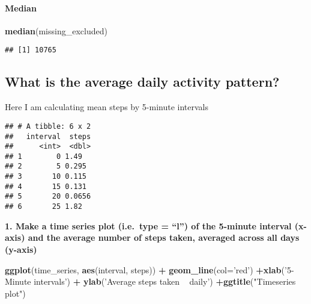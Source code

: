 \documentclass[]{article}
\newenvironment{Shaded}{\begin{snugshade}}{\end{snugshade}}
\newcommand{\CommentTok}[1]{\textcolor[rgb]{0.56,0.35,0.01}{\textit{#1}}}
\newcommand{\DataTypeTok}[1]{\textcolor[rgb]{0.13,0.29,0.53}{#1}}
\newcommand{\DecValTok}[1]{\textcolor[rgb]{0.00,0.00,0.81}{#1}}
\newcommand{\KeywordTok}[1]{\textcolor[rgb]{0.13,0.29,0.53}{\textbf{#1}}}
\newcommand{\NormalTok}[1]{#1}
\newcommand{\OperatorTok}[1]{\textcolor[rgb]{0.81,0.36,0.00}{\textbf{#1}}}
\newcommand{\StringTok}[1]{\textcolor[rgb]{0.31,0.60,0.02}{#1}}
\let\oldparagraph\paragraph
\renewcommand{\paragraph}[1]{\oldparagraph{#1}\mbox{}}
\begin{document}
\hypertarget{median}{%
\paragraph{Median}\label{median}}

\begin{Shaded}
\begin{Highlighting}[]
\KeywordTok{median}\NormalTok{(missing_excluded)}
\end{Highlighting}
\end{Shaded}

\begin{verbatim}
## [1] 10765
\end{verbatim}

\hypertarget{what-is-the-average-daily-activity-pattern}{%
\subsection{What is the average daily activity
pattern?}\label{what-is-the-average-daily-activity-pattern}}

Here I am calculating mean steps by 5-minute intervals

\begin{Shaded}
\end{Shaded}

\begin{verbatim}
## # A tibble: 6 x 2
##   interval  steps
##      <int>  <dbl>
## 1        0 1.49  
## 2        5 0.295 
## 3       10 0.115 
## 4       15 0.131 
## 5       20 0.0656
## 6       25 1.82
\end{verbatim}

\textbf{1. Make a time series plot
(i.e.~\color{red}{\verb|type = "l"|}type = ``l'') of the 5-minute
interval (x-axis) and the average number of steps taken, averaged across
all days (y-axis)}

\begin{Shaded}
\begin{Highlighting}[]
\KeywordTok{ggplot}\NormalTok{(time_series, }\KeywordTok{aes}\NormalTok{(interval, steps)) }\OperatorTok{+}\StringTok{ }\KeywordTok{geom_line}\NormalTok{(}\DataTypeTok{col=}\StringTok{'red'}\NormalTok{) }\OperatorTok{+}\KeywordTok{xlab}\NormalTok{(}\StringTok{'5- Minute intervals'}\NormalTok{) }\OperatorTok{+}\StringTok{ }
\KeywordTok{ylab}\NormalTok{(}\StringTok{'Average steps taken ~ daily'}\NormalTok{) }\OperatorTok{+}\KeywordTok{ggtitle}\NormalTok{(}\StringTok{"Timeseries plot"}\NormalTok{)}
\end{Highlighting}
\end{Shaded}
\end{document}
